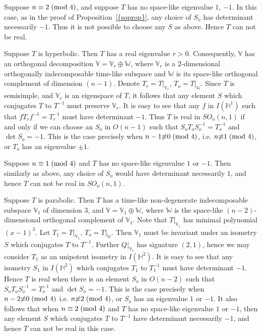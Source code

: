 \documentclass[11pt]{amsart}
\theoremstyle{definition}
\theoremstyle{remark}
\numberwithin{equation}{section}
\theoremstyle{plain}
\begin{document}
Suppose $n \equiv 2\;(\hbox{mod }4)$, and suppose $T$ has no space-like eigenvalue $1$, $-1$. In this case, as in the proof of {Proposition~\ref{{soprop}}},  any choice of $S_o$ has determinant necessarily $-1$. Thus it is not possible to choose any $S$ as above. Hence $T$ can not be real. 

Suppose $T$ is hyperbolic. Then $T$ has a real eigenvalue $r>0$. Consequently, ${\mathbb V}$ has an orthogonal decomposition ${\mathbb V}={\mathbb V}_r \oplus {\mathbb W}$, where ${\mathbb V}_r$ is a $2$-dimensional orthogonally indecomposable time-like subspace and ${\mathbb W}$  is its space-like orthogonal complement of dimension $(n-1)$. Denote $T_r=T|_{{\mathbb V}_r}$, $T_o=T|_{\mathbb W}$. Since $T$ is semisimple, and ${\mathbb V}_r$ is an eigenspace of $T$, it follows that any element $S$ which conjugates $T$ to $T^{-1}$ must preserve ${\mathbb V}_r$. It is easy to see that any $f$ in $I({\mathbb H}^1)$ such that $fT_rf^{-1}=T_r^{-1}$ must have determinant $-1$. Thus $T$ is real in  $SO_o(n,1)$  if and only if we can choose an $S_o$ in $O(n-1)$ such that $S_oT_oS_o^{-1}=T_o^{-1}$ and $\det S_o=-1$. This is the case precisely when $n-1 {\not \equiv} 0\;(\hbox{mod }4)$, i.e. 
$n {\not \equiv} 1\;(\hbox{mod }4)$, or $T_o$ has an eigenvalue $\pm 1$.

Suppose $n \equiv 1\;(\hbox{mod }4)$ and $T$ has no space-like eigenvalue $1$ or $-1$.  
Then similarly as above, any choice of $S_o$ would have determinant necessarily $1$, and hence $T$ can not be real in $SO_o(n,1)$. 

Suppose $T$ is parabolic. Then $T$ has a time-like non-degenerate indecomposable subspace 
${\mathbb V}_1$ of dimension $3$, and ${\mathbb V}={\mathbb V}_1 \oplus {\mathbb W}$, where ${\mathbb W}$ is the space-like $(n-2)$-dimensional orthogonal complement of ${\mathbb V}_1$. Note that $T|_{{\mathbb V}_1}$ has minimal polynomial $(x-1)^3$. Let $T_1=T|_{{\mathbb V}_1}$, $T_o=T|_{\mathbb W}$. Then ${\mathbb V}_1$ must be invariant under an isometry $S$ which conjugates $T$ to $T^{-1}$. Further $Q|_{{\mathbb V}_1}$ has signature $(2,1)$, hence we may consider $T_1$ as an unipotent isometry in $I({\mathbb H}^2)$. 
It is easy to see that any isometry $S_1$ in $I({\mathbb H}^2)$ which conjugates $T_1$ to  $T_1^{-1}$ must have determinant $-1$. Hence $T$ is real when there is an element $S_o$ in $O(n-2)$ such that $S_oT_oS_o^{-1}=T_o^{-1}$ and $\det S_o=-1$. This is the case precisely when $n-2 {\not \equiv} 0\;(\hbox{mod }4)$ i.e. $n {\not \equiv} 2\;(\hbox{mod }4)$, or $S_o$ has an eigenvalue $1$ or $-1$. It also follows that when $n \equiv 2\; (\hbox{mod }4)$ and $T$ has no space-like eigenvalue $1$ or $-1$, then any element $S$ which conjugates $T$ to $T^{-1}$ have determinant necessarily $-1$, and  hence $T$ can not be real in this case. 
\end{document}
